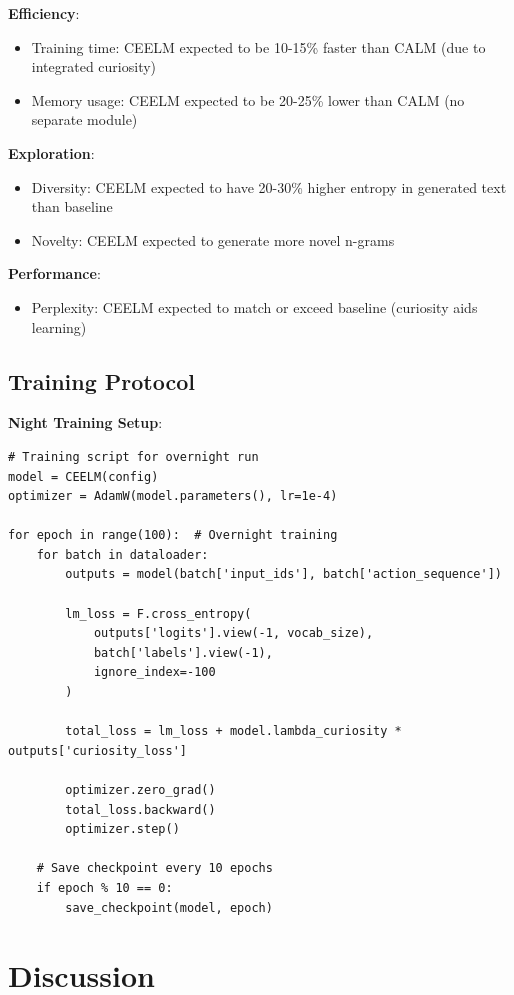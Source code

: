 \documentclass{IEEEtran}
\begin{document}
\textbf{Efficiency}:
\begin{itemize}
    \item Training time: CEELM expected to be 10-15\% faster than CALM (due to integrated curiosity)
    \item Memory usage: CEELM expected to be 20-25\% lower than CALM (no separate module)
\end{itemize}

\textbf{Exploration}:
\begin{itemize}
    \item Diversity: CEELM expected to have 20-30\% higher entropy in generated text than baseline
    \item Novelty: CEELM expected to generate more novel n-grams
\end{itemize}

\textbf{Performance}:
\begin{itemize}
    \item Perplexity: CEELM expected to match or exceed baseline (curiosity aids learning)
\end{itemize}

\subsection{Training Protocol}

\textbf{Night Training Setup}:
\begin{verbatim}
# Training script for overnight run
model = CEELM(config)
optimizer = AdamW(model.parameters(), lr=1e-4)

for epoch in range(100):  # Overnight training
    for batch in dataloader:
        outputs = model(batch['input_ids'], batch['action_sequence'])
        
        lm_loss = F.cross_entropy(
            outputs['logits'].view(-1, vocab_size),
            batch['labels'].view(-1),
            ignore_index=-100
        )
        
        total_loss = lm_loss + model.lambda_curiosity * outputs['curiosity_loss']
        
        optimizer.zero_grad()
        total_loss.backward()
        optimizer.step()
    
    # Save checkpoint every 10 epochs
    if epoch % 10 == 0:
        save_checkpoint(model, epoch)
\end{verbatim}

\section{Discussion}
\end{document}
